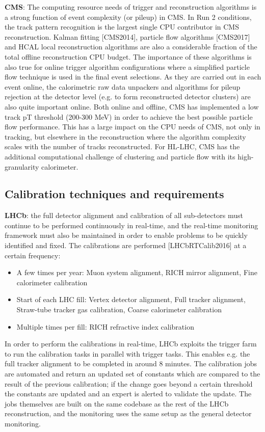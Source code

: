 \vskip 0.5cm
\noindent
{\bf CMS}: The computing resource needs of trigger and reconstruction algorithms is a strong function of event complexity (or pileup) in CMS. In Run 2 conditions, the track pattern recognition is the largest single CPU contributor in CMS reconstruction. Kalman fitting [CMS2014], particle flow algorithms [CMS2017] and HCAL local reconstruction algorithms are also a considerable fraction of the total offline reconstruction CPU budget. The importance of these algorithms is also true for online trigger algorithm configurations where a simplified particle flow technique is used in the final event selections. As they are carried out in each event online, the calorimetric raw data unpackers and algorithms for pileup rejection at the detector level (e.g. to form reconstructed detector clusters) are also quite important online. Both online and offline, CMS has implemented a low track pT threshold (200-300 MeV) in order to achieve the best possible particle flow performance. This has a large impact on the CPU needs of CMS, not only in tracking, but elsewhere in the reconstruction where the algorithm complexity scales with the number of tracks reconstructed. For HL-LHC, CMS has the additional computational challenge of clustering and particle flow with its high-granularity calorimeter.

\subsection{Calibration techniques and requirements}
{\bf LHCb}: the full detector alignment and calibration of all sub-detectors must continue to be performed continuously in real-time, and the real-time monitoring framework must also be maintained in order to enable problems to be quickly identified and fixed. The calibrations are performed [LHCbRTCalib2016] at a certain frequency:
\begin{itemize}
\item
A few times per year: Muon system alignment, RICH mirror alignment, Fine calorimeter calibration 
\item
Start of each LHC fill: Vertex detector alignment, Full tracker alignment, Straw-tube tracker gas calibration, Coarse calorimeter calibration
\item
Multiple times per fill: RICH refractive index calibration
\end{itemize}
In order to perform the calibrations in real-time, LHCb exploits the trigger farm to run the calibration tasks in parallel with trigger tasks. This enables e.g. the full tracker alignment to be completed in around 8 minutes. The calibration jobs are automated and return an updated set of constants which are compared to the result of the previous calibration; if the change goes beyond a certain threshold the constants are updated and an expert is alerted to validate the update. The jobs themselves are built on the same codebase as the rest of the LHCb reconstruction, and the monitoring uses the same setup as the general detector monitoring.

